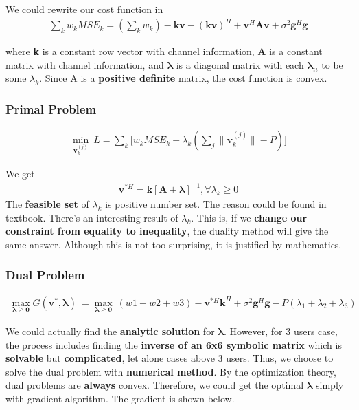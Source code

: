 \documentclass[11pt, oneside]{article}   	%
\begin{document}
We could rewrite our cost function in
\begin{align*}
\displaystyle\sum_{k} 	w_k	MSE_{k}	=  (\displaystyle\sum_{k} w_k)-\textbf{kv}-(\textbf{kv})^{H}+\textbf{v}^{H}\textbf{A}\textbf{v}+ \sigma^{2} \textbf{g}^{H} \textbf{g}
\end{align*}

where \textbf{k} is a constant row vector with channel information, \textbf{A} is a constant matrix with channel information, and $\pmb{\lambda}$ is a diagonal matrix with each $\pmb{\lambda}_{ii}$ to be some $\lambda_{k}$. Since A is a \textbf{positive definite} matrix, the cost function is convex.




\subsubsection{Primal Problem}

\begin{align*}
\min_{\textbf{v}_{k}^{(j)}}\
L =\displaystyle\sum_{k} 	\bigg[w_k	MSE_{k}	+	\lambda_{k}	(\displaystyle\sum_{j}	\|	\textbf{v}^{(j)}_{k}	\|	-P	)	\bigg]
\end{align*}

We get 
\begin{align*}
\textbf{v}^{*H} = \textbf{k}[\textbf{A}+\pmb{\lambda}]^{-1}, \forall \lambda_{k} \geq 0
\end{align*}
The \textbf{feasible set} of $\lambda_{k}$ is positive number set. The reason could be found in textbook. There's an interesting result of $\lambda_{k}$. This is, if we \textbf{change our constraint from equality to inequality}, the duality method will give the same answer. Although this is not too surprising, it is justified by mathematics.






\subsubsection{Dual Problem}

\begin{align*}
\max_{	\pmb{\lambda} \geq \textbf{0}	}	G( \textbf{v}^{*}, \pmb{\lambda} ) \ = \max_{	\pmb{\lambda}	\geq \textbf{0}}\ (w1+w2+w3) - \textbf{v}^{*H}\textbf{k}^{H} + \sigma^{2} \textbf{g}^{H} \textbf{g} - P(\lambda_{1}+\lambda_{2}+\lambda_{3})
\end{align*}

We could actually find the \textbf{analytic solution} for $\pmb{\lambda}$. However, for 3 users case, the process includes finding the \textbf{inverse of an 6x6 symbolic matrix}  which is \textbf{solvable} but \textbf{complicated}, let alone cases above 3 users. Thus, we choose to solve the dual problem with \textbf{numerical method}. By the optimization theory, dual problems are \textbf{always} convex. Therefore, we could get the optimal $\pmb{\lambda}$ simply with gradient algorithm. The gradient is shown below.
\end{document}
